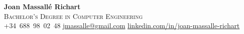 \documentclass[11pt,a4paper]{article}
\begin{document}
\begin{center}
    
    {\Huge \color{primary} \textbf{Joan Massallé Richart}} \\
    \vspace{3pt}
    {\Large \color{subheadings} \textsc{Bachelor's Degree in Computer Engineering}} \\
    \vspace{8pt}
    \color{headings}
    \faPhone \space +34~688~98~02~48 \space \textbullet \space
    \vspace{2pt}
    \faEnvelope \space \href{mailto:jmassalle@gmail.com}{jmassalle@gmail.com} \space \textbullet \space
    \faLinkedin \space \href{https://www.linkedin.com/in/joan-massall%C3%A9-richart-a9064a287/}{linkedin.com/in/joan-massalle-richart} \\
\end{center}

\vspace{15pt}
\end{document}

